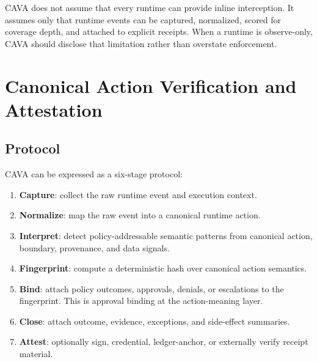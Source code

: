 \documentclass[11pt]{article}
\begin{document}
CAVA does not assume that every runtime can provide inline interception. It assumes only that runtime events can be captured, normalized, scored for coverage depth, and attached to explicit receipts. When a runtime is observe-only, CAVA should disclose that limitation rather than overstate enforcement.

\section{Canonical Action Verification and Attestation}

\subsection{Protocol}

CAVA can be expressed as a six-stage protocol:
\begin{enumerate}
  \item \textbf{Capture}: collect the raw runtime event and execution context.
  \item \textbf{Normalize}: map the raw event into a canonical runtime action.
  \item \textbf{Interpret}: detect policy-addressable semantic patterns from canonical action, boundary, provenance, and data signals.
  \item \textbf{Fingerprint}: compute a deterministic hash over canonical action semantics.
  \item \textbf{Bind}: attach policy outcomes, approvals, denials, or escalations to the fingerprint. This is approval binding at the action-meaning layer.
  \item \textbf{Close}: attach outcome, evidence, exceptions, and side-effect summaries.
  \item \textbf{Attest}: optionally sign, credential, ledger-anchor, or externally verify receipt material.
\end{enumerate}
\end{document}
